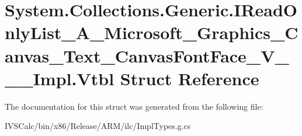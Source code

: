 \hypertarget{struct_system_1_1_collections_1_1_generic_1_1_i_read_only_list___a___microsoft___graphics___canv918217412f37cccf033f7bca6d629015}{}\section{System.\+Collections.\+Generic.\+I\+Read\+Only\+List\+\_\+\+A\+\_\+\+Microsoft\+\_\+\+Graphics\+\_\+\+Canvas\+\_\+\+Text\+\_\+\+Canvas\+Font\+Face\+\_\+\+V\+\_\+\+\_\+\+\_\+\+Impl.\+Vtbl Struct Reference}
\label{struct_system_1_1_collections_1_1_generic_1_1_i_read_only_list___a___microsoft___graphics___canv918217412f37cccf033f7bca6d629015}


The documentation for this struct was generated from the following file\+:\begin{DoxyCompactItemize}
\item 
I\+V\+S\+Calc/bin/x86/\+Release/\+A\+R\+M/ilc/Impl\+Types.\+g.\+cs\end{DoxyCompactItemize}
